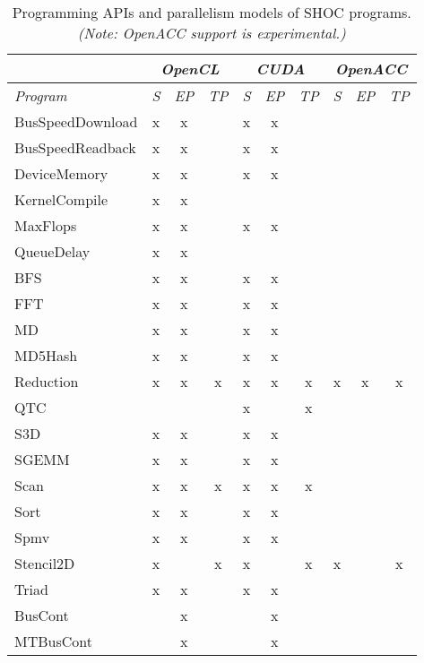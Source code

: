 \documentclass[11pt]{article}
\begin{document}
\begin{table}
\centering
\begin{tabular}{|l||c|c|c||c|c|c||c|c|c|}
\hline
 & \multicolumn{3}{c|}{\em OpenCL} & \multicolumn{3}{c|}{\em CUDA} & \multicolumn{3}{c|}{\em OpenACC} \\
\hline
{\em Program} & {\em S} & {\em EP} & {\em TP} & {\em S} & {\em EP} & {\em TP} & {\em S} & {\em EP} & {\em TP} \\
\hline\hline
BusSpeedDownload    & x & x &   & x & x &   &   &   &   \\
BusSpeedReadback    & x & x &   & x & x &   &   &   &   \\
DeviceMemory        & x & x &   & x & x &   &   &   &   \\
KernelCompile       & x & x &   &   &   &   &   &   &   \\
MaxFlops            & x & x &   & x & x &   &   &   &   \\
QueueDelay          & x & x &   &   &   &   &   &   &   \\
BFS                 & x & x &   & x & x &   &   &   &   \\
FFT                 & x & x &   & x & x &   &   &   &   \\
MD                  & x & x &   & x & x &   &   &   &   \\
MD5Hash             & x & x &   & x & x &   &   &   &   \\
Reduction           & x & x & x & x & x & x & x & x & x \\
QTC                 &   &   &   & x &   & x &   &   &   \\
S3D                 & x & x &   & x & x &   &   &   &   \\
SGEMM               & x & x &   & x & x &   &   &   &   \\
Scan                & x & x & x & x & x & x &   &   &   \\
Sort                & x & x &   & x & x &   &   &   &   \\
Spmv                & x & x &   & x & x &   &   &   &   \\
Stencil2D           & x &   & x & x &   & x & x &   & x \\
Triad               & x & x &   & x & x &   &   &   &   \\
BusCont             &   & x &   &   & x &   &   &   &   \\
MTBusCont           &   & x &   &   & x &   &   &   &   \\
\hline
\end{tabular}
\caption{Programming APIs and parallelism models of SHOC programs. {\em (Note: OpenACC support is experimental.)} }
\end{table}
\end{document}
